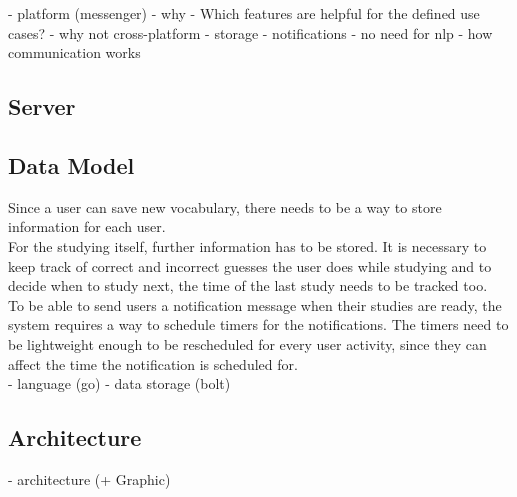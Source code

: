 - platform (messenger)
  - why
    - Which features are helpful for the defined use cases?
  - why not cross-platform
    - storage
    - notifications
    - no need for nlp
  - how communication works


\subsection{Server}

\subsection{Data Model}


Since a user can save new vocabulary,
there needs to be a way to store information for each user.
\\
For the studying itself, further information has to be stored.
It is necessary to keep track of correct and incorrect guesses the user does while studying
and to decide when to study next, the time of the last study needs to be tracked too.
\\

To be able to send users a notification message when their studies are ready,
the system requires a way to schedule timers for the notifications.
The timers need to be lightweight enough to be rescheduled for every user activity,
since they can affect the time the notification is scheduled for.
\\


- language (go)
- data storage (bolt)


\subsection{Architecture}

- architecture (+ Graphic)

